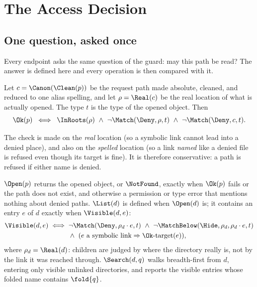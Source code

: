 \section{The Access Decision}
\label{sec:access}

\subsection{One question, asked once}

Every endpoint asks the same question of the guard: may this path be read?  The
answer is defined here and every operation is then compared with it.

\begin{definition}[Access]
\label{def:ok}
Let $c=\Canon(\Clean(p))$ be the request path made absolute, cleaned, and
reduced to one alias spelling, and let $\rho=\Real(c)$ be the real location of
what is actually opened.  The type $t$ is the type of the opened object.  Then
\[
  \Ok(p)\;\iff\;
  \InRoots(\rho)\ \land\ \neg\Match(\Deny,\rho,t)\ \land\ \neg\Match(\Deny,c,t).
\]
\end{definition}

The check is made on the \emph{real} location (so a symbolic link cannot lead
into a denied place), and also on the \emph{spelled} location (so a link
\emph{named} like a denied file is refused even though its target is fine).  It
is therefore conservative: a path is refused if either name is denied.

\begin{definition}
$\Open(p)$ returns the opened object, or $\NotFound$, exactly when $\Ok(p)$
fails or the path does not exist, and otherwise a permission or type error that
mentions nothing about denied paths.  $\List(d)$ is defined when $\Open(d)$ is;
it contains an entry $e$ of $d$ exactly when $\Visible(d,e)$:
\begin{align*}
  \Visible(d,e)\iff{}& \neg\Match(\Deny,\rho_d\cdot e,t)\ \land\
      \neg\MatchBelow(\Hide,\rho_d,\rho_d\cdot e,t)\\
  &\land\ (e\text{ a symbolic link}\Rightarrow\Ok\text{-target}(e)),
\end{align*}
where $\rho_d=\Real(d)$: children are judged by where the directory really is,
not by the link it was reached through.  $\Search(d,q)$ walks breadth-first from
$d$, entering only visible unlinked directories, and reports the visible entries
whose folded name contains $\fold{q}$.
\end{definition}

